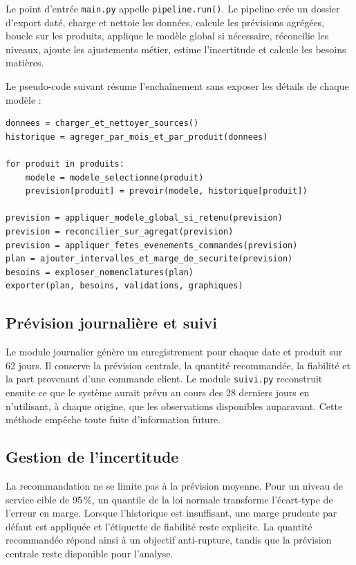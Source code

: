 Le point d'entrée \texttt{main.py} appelle \texttt{pipeline.run()}. Le pipeline
crée un dossier d'export daté, charge et nettoie les données, calcule les
prévisions agrégées, boucle sur les produits, applique le modèle global si
nécessaire, réconcilie les niveaux, ajoute les ajustements métier, estime
l'incertitude et calcule les besoins matières.

Le pseudo-code suivant résume l'enchaînement sans exposer les détails de chaque
modèle :

\begin{lstlisting}[style=paulpython,caption={Pseudo-code du pipeline mensuel},label={lst:pipeline}]
donnees = charger_et_nettoyer_sources()
historique = agreger_par_mois_et_par_produit(donnees)

for produit in produits:
    modele = modele_selectionne(produit)
    prevision[produit] = prevoir(modele, historique[produit])

prevision = appliquer_modele_global_si_retenu(prevision)
prevision = reconcilier_sur_agregat(prevision)
prevision = appliquer_fetes_evenements_commandes(prevision)
plan = ajouter_intervalles_et_marge_de_securite(prevision)
besoins = exploser_nomenclatures(plan)
exporter(plan, besoins, validations, graphiques)
\end{lstlisting}

\subsection{Prévision journalière et suivi}

Le module journalier génère un enregistrement pour chaque date et produit sur 62
jours. Il conserve la prévision centrale, la quantité recommandée, la fiabilité et
la part provenant d'une commande client. Le module \texttt{suivi.py} reconstruit
ensuite ce que le système aurait prévu au cours des 28 derniers jours en
n'utilisant, à chaque origine, que les observations disponibles auparavant. Cette
méthode empêche toute fuite d'information future.

\subsection{Gestion de l'incertitude}

La recommandation ne se limite pas à la prévision moyenne. Pour un niveau de
service cible de 95\,\%, un quantile de la loi normale transforme l'écart-type de
l'erreur en marge. Lorsque l'historique est insuffisant, une marge prudente par
défaut est appliquée et l'étiquette de fiabilité reste explicite. La quantité
recommandée répond ainsi à un objectif anti-rupture, tandis que la prévision
centrale reste disponible pour l'analyse.


